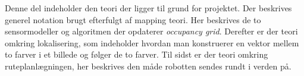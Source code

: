 Denne del indeholder den teori der ligger til grund for projektet.
Der beskrives generel notation brugt efterfulgt af mapping teori.
Her beskrives de to sensormodeller og algoritmen der opdaterer \textit{occupancy grid}.
Derefter er der teori omkring lokalisering, som indeholder hvordan man konstruerer en vektor mellem to farver i et billede og følger de to farver.
Til sidst er der teori omkring ruteplanlægningen, her beskrives den måde robotten sendes rundt i verden på.